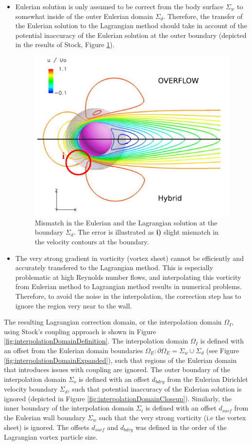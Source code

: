 	\begin{itemize}
	\item Eulerian solution is only assumed to be correct from the body surface $\Sigma_w$ to somewhat inside of the outer Eulerian domain $\Sigma_d$. Therefore, the transfer of the Eulerian solution to the Lagrangian method should take in account of the potential inaccuracy of the Eulerian solution at the outer boundary (depicted in the results of Stock, Figure \ref{fig:stockBoundaryErrorMod}).
	
		\begin{figure}[!b]
			\centering
			\includegraphics[width=0.5\linewidth]{figures/hybrid/stockBoundaryErrorMod.png}
			\caption{Mismatch in the Eulerian and the Lagrangian solution at the boundary $\Sigma_d$. The error is illustrated as \textbf{i)} slight mismatch in the velocity contours at the boundary.}
			\label{fig:stockBoundaryErrorMod}
		\end{figure}		
	
	\item The very strong gradient in vorticity (vortex sheet) cannot be efficiently and accurately transfered to the Lagrangian method. This is especially problematic at high Reynolds number flows, and interpolating this vorticity from Eulerian method to Lagrangian method results in numerical problems. Therefore, to avoid the noise in the interpolation, the correction step has to ignore the region very near to the wall.
	\end{itemize}
	
	The resulting Lagrangian correction domain, or the interpolation domain $\Omega_I$, using Stock's coupling approach is shown in Figure \ref{fig:interpolationDomainDefinition}. The interpolation domain $\Omega_I$ is defined with an offset from the Eulerian domain boundaries $\Omega_E: \partial\Omega_E=\Sigma_w \cup \Sigma_d$ (see Figure \ref{fig:interpolationDomainExpanded}), such that regions of the Eulerian domain that introduces issues with coupling are ignored. The outer boundary of the interpolation domain $\Sigma_o$ is defined with an offset $d_{bdry}$ from the Eulerian Dirichlet velocity boundary $\Sigma_d$, such that potential inaccuracy of the Eulerian solution is ignored (depicted in Figure \ref{fig:interpolationDomainCloseup}). Similarly, the inner boundary of the interpolation domain $\Sigma_i$ is defined with an offset $d_{surf}$ from the Eulerian wall boundary $\Sigma_w$ such that the very strong vorticity (i.e the vortex sheet) is ignored. The offsets $d_{surf}$ and $d_{bdry}$ was defined in the order of the Lagrangian vortex particle size.
	
